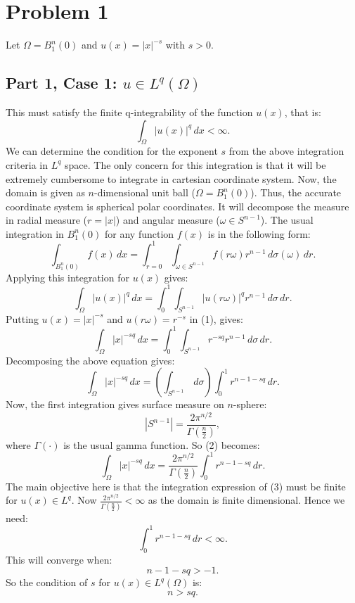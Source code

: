 \section{Problem 1}

Let $\Omega = B_1^n(0)$ and $u(x)=|x|^{-s}$ with $s>0$.

\subsection{Part 1, Case 1: $u \in L^q(\Omega)$}
This must satisfy the finite q-integrability of the function $u(x)$, that is:
\[
\int_\Omega |u(x)|^q \, dx <\infty.
\]
We can determine the condition for the exponent $s$ from the above integration criteria in $L^q$ space. The only concern for this integration is that it will be extremely cumbersome to integrate in cartesian coordinate system. Now, the domain is given as $n$-dimensional unit ball ($\Omega = B_1^n(0)$). Thus, the accurate coordinate system is spherical polar coordinates. It will decompose the measure in radial measure ($r=|x|$) and angular measure ($\omega\in S^{n-1}$). The usual integration in $B_1^n(0)$ for any function $f(x)$ is in the following form:
\[
\int_{B_1^n(0)} f(x) \, dx = \int_{r=0}^1\int_{\omega\in S^{n-1}} f(r\omega)r^{n-1} \, d\sigma(\omega) \, dr.
\]
Applying this integration for $u(x)$ gives:
\begin{equation}
    \int_\Omega |u(x)|^q \, dx = \int_0^1\int_{S^{n-1}} |u(r\omega)|^q r^{n-1} \, d\sigma \, dr.
\end{equation}
Putting $u(x)=|x|^{-s}$ and $u(r\omega)=r^{-s}$ in (1), gives:
\[
\int_\Omega |x|^{-sq} \, dx = \int_0^1\int_{S^{n-1}} r^{-sq}r^{n-1} \, d\sigma \,dr.
\]
Decomposing the above equation gives:
\begin{equation}
    \int_\Omega |x|^{-sq} \, dx = \left(\int_{S^{n-1}} \, d\sigma \right)\int_0^1 r^{n-1-sq} \, dr.
\end{equation}
Now, the first integration gives surface measure on $n$-sphere:
\[
|S^{n-1}| = \frac{2\pi^{n/2}}{\Gamma(\frac{n}{2})},
\]
where $\Gamma(\cdot)$ is the usual gamma function. So (2) becomes:
\begin{equation}
    \int_\Omega |x|^{-sq} \, dx = \frac{2\pi^{n/2}}{\Gamma(\frac{n}{2})}\int_0^1 r^{n-1-sq} \, dr.
\end{equation}
The main objective here is that the integration expression of (3) must be finite for $u(x)\in L^q$. Now $\frac{2\pi^{n/2}}{\Gamma(\frac{n}{2})} < \infty$ as the domain is finite dimensional. Hence we need:
\[
\int_0^1 r^{n-1-sq} \, dr <\infty.
\]
This will converge when:
\[
n-1-sq > -1.
\]
So the condition of $s$ for $u(x)\in L^q(\Omega)$ is:
\[
\boxed{
n > sq.
}
\]

